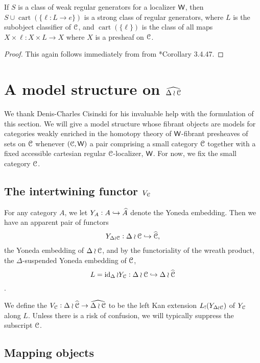 \begin{prop}\label{boostgenerators} If \(S\) is a class of weak regular generators for a localizer \(\mathsf{W}\), then \(S\cup \operatorname{cart}(\{\ell:L\to e\})\) is a strong class of regular generators, where \(L\) is the subobject classifier of \(\mathcal{C}\), and \(\operatorname{cart}(\{\ell\})\) is the class of all maps \(X\times \ell:X\times L \to X\) where \(X\) is a presheaf on \(\mathcal{C}\).  
\end{prop}
\begin{proof}This again follows immediately from from \cite{cisinski-book}*{Corollary 3.4.47}.
\end{proof}


\section{A model structure on $\widehat{\Delta \wr \mathcal{C}}$}\label{sec:cishelp}
We thank Denis-Charles Cisinski for his invaluable help with the formulation of this section. We will give a model structure whose fibrant objects are models for categories weakly enriched in the homotopy theory of \(\mathsf{W}\)-fibrant presheaves of sets on \(\mathcal{C}\) whenever \((\mathcal{C},\mathsf{W})\) a pair comprising a small category \(\mathcal{C}\) together with a fixed accessible cartesian regular \(\mathcal{C}\)-localizer, \(\mathsf{W}\).  For now, we fix the small category \(\mathcal{C}\).

\subsection{The intertwining functor $V_{\mathcal{C}}$}
For any category \(A\), we let \(Y_A:A\hookrightarrow \widehat{A}\) denote the Yoneda embedding. Then we have an apparent pair of functors \[Y_{\Delta \wr \mathcal{C}}:\Delta \wr \mathcal{C} \hookrightarrow \widehat{\mathcal{C}},\] the Yoneda embedding of \(\Delta \wr \mathcal{C}\), and by the functoriality of the wreath product, the \(\Delta\)-suspended Yoneda embedding of \(\mathcal{C}\), \[L=\operatorname{id}_\Delta\wr Y_{\mathcal{C}}:\Delta \wr \mathcal{C} \hookrightarrow \Delta \wr \widehat{\mathcal{C}}\].  

We define the  \(V_{\mathcal{C}}:\Delta \wr \widehat{\mathcal{C}} \to \widehat{\Delta \wr \mathcal{C}}\) to be the left Kan extension \(L_!(Y_{\Delta \wr \mathcal{C}})\) of \(Y_{\mathcal{C}}\) along \(L\).  Unless there is a risk of confusion, we will typically suppress the subscript \(\mathcal{C}\).

\subsection{Mapping objects}

